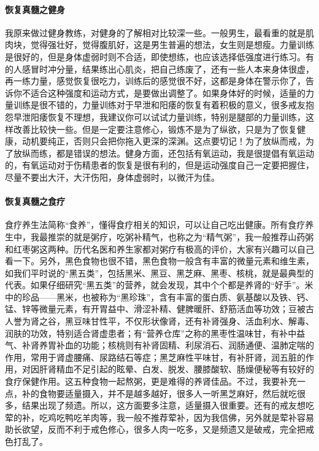 \paragraph{恢复真髓之健身}

我原来做过健身教练，对健身的了解相对比较深一些。一般男生，最看重的就是肌肉块，觉得强壮好，觉得腹肌好，这是男生普遍的想法，女生则是想瘦。力量训练是很好的，但是身体虚弱时则不合适，即使想练，也应该选择低强度进行练习。有的人感冒时冲分量，结果练出心肌炎，把自己练废了，还有一些人本来身体很虚，再一练力量，感觉恢复很吃力，训练后的感觉很不好，这都是身体在警示你了，告诉你不适合这种强度和运动方式，是要做出调整了。如果身体好的时候，适量的力量训练是很不错的，力量训练对于早泄和阳痿的恢复有着积极的意义，很多戒友抱怨早泄阳痿恢复不理想，我建议你可以试试力量训练，特别是腿部的力量训练，这样改善比较快一些。但是一定要注意修心，锻炼不是为了纵欲，只是为了恢复健康，动机要纯正，否则只会把你拖入更深的深渊。这点要切记！为了放纵而戒，为了放纵而练，都是错误的想法。健身方面，还包括有氧运动，我是很提倡有氧运动的，有氧运动对于伤精患者的恢复是很有利的，但是运动强度自己一定要把握住，尽量不要出大汗，大汗伤阳，身体虚弱时，以微汗为佳。

\paragraph{恢复真髓之食疗}

食疗养生法简称“食养”，懂得食疗相关的知识，可以让自己吃出健康。所有食疗养生中，我最推崇的就是粥疗，吃粥补精气，也称之为“精气粥”，我一般推荐山药粥和红枣粥这两种。历代名医和养生家都对粥疗有极高的评价，大家有兴趣可以自己看一下。另外，黑色食物也很不错，黑色食物一般含有丰富的微量元素和维生素，如我们平时说的“黑五类”，包括黑米、黑豆、黑芝麻、黑枣、核桃，就是最典型的代表。如果仔细研究“黑五类”的营养，就会发现，其中个个都是养肾的“好手”。米中的珍品——黑米，也被称为“黑珍珠”，含有丰富的蛋白质、氨基酸以及铁、钙、锰、锌等微量元素，有开胃益中、滑涩补精、健脾暖肝、舒筋活血等功效；豆被古人誉为肾之谷，黑豆味甘性平，不仅形状像肾，还有补肾强身、活血利水、解毒、润肤的功效，特别适合肾虚患者；有“营养仓库”之称的黑枣性温味甘，有补中益气、补肾养胃补血的功能；核桃则有补肾固精、利尿消石、润肠通便、温肺定喘的作用，常用于肾虚腰痛、尿路结石等症；黑芝麻性平味甘，有补肝肾，润五脏的作用，对因肝肾精血不足引起的眩晕、白发、脱发、腰膝酸软、肠燥便秘等有较好的食疗保健作用。这五种食物一起熬粥，更是难得的养肾佳品。不过，我要补充一点，补的食物要适量摄入，并不是越多越好，很多人一听黑芝麻好，然后就吃很多，结果出现了频遗。所以，这方面要多注意，适量摄入很重要。还有的戒友想吃荤的补，吃鸡吃鸭吃羊肉等，我一般不推荐荤补，因为我信佛，另外就是荤补容易助长欲望，反而不利于戒色修心，很多人肉一吃多，又是频遗又是破戒，完全把戒色打乱了。

